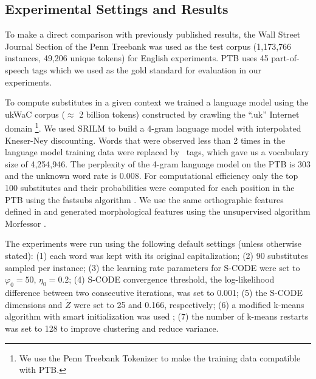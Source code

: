 \subsection{Experimental Settings and Results}
\label{sec:expset}

To make a direct comparison with previously published results,
the Wall Street Journal Section of the Penn Treebank was used as the
test corpus (1,173,766 instances, 49,206 unique tokens) for English
experiments.
PTB uses 45 part-of-speech tags which we used as the gold standard for
evaluation in our experiments.

To compute substitutes in a given context we trained a language model
using the ukWaC corpus ($\approx$ 2 billion tokens) constructed by
crawling the ``.uk'' Internet
domain \cite{ferraresi2008introducing}\footnote{We use the Penn
  Treebank Tokenizer to make the training data compatible with PTB.}.
We used SRILM \cite{Stolcke2002} to build a 4-gram language model with
interpolated Kneser-Ney discounting.
Words that were observed less than 2 times in the language model
training data were replaced by \unk\ tags, which gave us a
vocabulary size of 4,254,946. 
The perplexity of the 4-gram language model on the PTB is 303 and the
unknown word rate is 0.008.  For computational efficiency only the top
100 substitutes and their probabilities were computed for each
position in the PTB using the {\sc fastsubs} algorithm \cite{yuret2012fastsub}.  
We use the same orthographic features defined in
\cite{yatbaz-sert-yuret:2012:EMNLP-CoNLL} and generated morphological
features using the unsupervised algorithm Morfessor \cite{creutz05}.

The experiments were run using the following default settings (unless otherwise
stated): (1) each word was kept with its original capitalization; (2) 90
substitutes sampled per instance; (3) the learning rate parameters for S-CODE
were set to $\varphi_0=50$, $\eta_0=0.2$; (4) S-CODE convergence threshold,
the log-likelihood difference between two consecutive iterations, was set to
0.001; (5) the S-CODE dimensions and $\tilde{Z}$ were set to 25 and 0.166,
respectively; (6) a modified k-means algorithm with smart initialization was
used \cite{arthur2007k}; (7) the number of k-means restarts was set to
128 to improve clustering and reduce variance.

